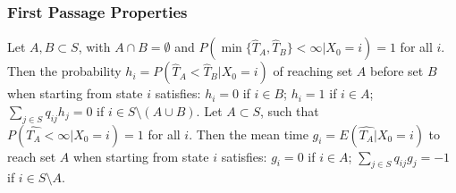 \subsubsection*{First Passage Properties}
 Let $A, B \subset S$, with $A \cap B = \emptyset$ and $P(\min\{\hat{T}_A, \hat{T}_B\} < \infty | X_0 = i) = 1$ for all $i$. Then the probability $h_i = P(\hat{T}_A < \hat{T}_B | X_0 = i)$ of reaching set $A$ before set $B$ when starting from state $i$ satisfies: 
$h_i = 0$ if $i \in B$; 
$h_i = 1$ if $i \in A$; 
$\sum_{j \in S} q_{ij}h_j = 0$ if $i \in S \setminus (A \cup B)$.
 Let $A \subset S$, such that $P(\hat{T_A} < \infty | X_0 = i) = 1$ for all $i$. Then the mean time $g_i = E(\hat{T_A} | X_0 = i)$ to reach set $A$ when starting from state $i$ satisfies: $g_i = 0$ if $i \in A$; $\sum_{j \in S} q_{ij} g_j = -1$ if $i \in S \setminus A$.